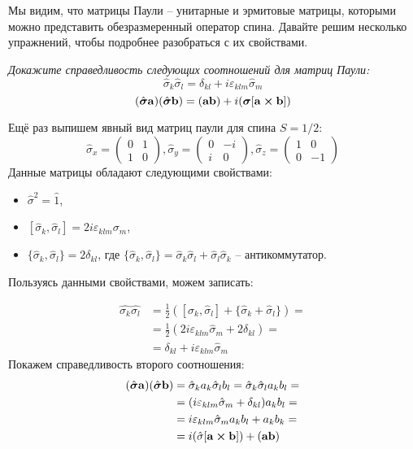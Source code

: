 Мы видим, что матрицы Паули -- унитарные и эрмитовые матрицы, которыми можно представить обезразмеренный оператор спина. Давайте решим несколько упражнений, чтобы подробнее разобраться с их свойствами.
\begin{center}
    \textit{Докажите справедливость следующих соотношений для матриц Паули:}
    \[
    \hat{\sigma}_k\hat{\sigma}_l = \delta_{kl} + i\varepsilon_{klm}\hat{\sigma}_m
    \]
    \[
    (\hat{\boldsymbol{\sigma}}\mathbf{a})(\hat{\boldsymbol{\sigma}}\mathbf{b}) = (\mathbf{ab}) + i(\boldsymbol{\sigma}[\mathbf{a} \cross \mathbf{b}])
    \]
\end{center}

Ещё раз выпишем явный вид матриц паули для спина $S=1/2$:
\[
    \hat{\sigma}_x = \left(\begin{array}{cc}
        0 & 1 \\
        1 & 0
    \end{array}
    \right), 
    \hat{\sigma}_y = \left(\begin{array}{cc}
        0 & -i \\
        i & 0
    \end{array}
    \right),
    \hat{\sigma}_z = \left(\begin{array}{cc}
        1 & 0 \\
        0 & -1
    \end{array}
    \right)
\]
Данные матрицы обладают следующими свойствами:
\begin{itemize}
    \item $\hat{\sigma}^2 = \hat{1}$,
    \item $[\hat{\sigma}_k, \hat{\sigma}_l] = 2i\varepsilon_{klm}\sigma_m$,
    \item $\{\hat{\sigma}_k, \hat{\sigma}_l\} = 2\delta_{kl}$, где $\{\hat{\sigma}_k, \hat{\sigma}_l\} = \hat{\sigma}_k\hat{\sigma}_l + \hat{\sigma}_l\hat{\sigma}_k$ -- антикоммутатор.
\end{itemize}
Пользуясь данными свойствами, можем записать:

\begin{align*}
\hat{\sigma_k}\hat{\sigma_l} &= \frac{1}{2}([\hat{\sigma}_k, \hat{\sigma}_l] + \{\hat{\sigma}_k + \hat{\sigma}_l\}) = \\
&=\frac{1}{2}(2i\varepsilon_{klm}\hat{\sigma}_m + 2\delta_{kl}) = \\
&=\delta_{kl} + i\varepsilon_{klm}\hat{\sigma}_m
\end{align*}
Покажем справедливость второго соотношения:
\begin{align*}
(\hat{\boldsymbol{\sigma}}\mathbf{a})(\hat{\boldsymbol{\sigma}}\mathbf{b}) &= \hat{\sigma}_ka_k\hat{\sigma}_lb_l = \hat{\sigma}_k\hat{\sigma}_la_kb_l= \\
&=(i\varepsilon_{klm}\hat{\sigma}_m + \delta_{kl})a_kb_l =\\
&= i\varepsilon_{klm}\hat{\sigma}_m a_k b_l + a_k b_k =\\
&= i(\hat{\sigma}[\mathbf{a}\cross\mathbf{b}]) + (\mathbf{a}\mathbf{b})
\end{align*}



